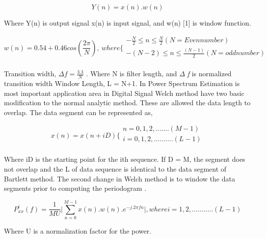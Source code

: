 \begin{enumerate}[label=\roman*]
\begin{equation}\tag{7.20}
Y ( n ) =x ( n ) .w ( n )
\end{equation}
\begin{justify}
Where Y(n) is output signal x(n) is input signal, and w(n) [1] is window function.
\end{justify}\par


\begin{equation}\tag{7.21}
w ( n ) =0.54+0.46cos ( \frac{2 \pi }{N} ) ,~ where \{ \begin{array}{ll}
	-\frac{N}{2} \leq n \leq \frac{N}{2}  ( N=Even number ) \\
	- ( N-2 )  \leq n \leq \frac{ ( N-1 ) }{2} ( N=odd number ) \\
	\end{array}
\end{equation}
\begin{justify}
Transition width,  \(  \Delta f=\frac{3.3}{N} \) . Where N is filter length, and $ \Delta $ \textit{f} is normalized transition width Window Length, L = N+1. In Power Spectrum Estimation is most important application area in Digital Signal Welch method have two basic modification to the normal analytic method. These are allowed the data length to overlap. The data segment can be represented as,
\end{justify}\par


\begin{equation}\tag{7.22}
x ( n ) =x ( n+iD )  \{ \begin{array}{ll}
	n=0,1,2, \ldots  \ldots . ( M-1 ) \\
	i=0,1,2, \ldots  \ldots  \ldots . ( L-1 ) \\
	\end{array}
\end{equation}
\begin{justify}
Where iD is the starting point for the ith sequence. If D = M, the segment does not overlap and the L of data sequence is identical to the data segment of Bartlett method. The second change in Welch method is to window the data segments prior to computing the periodogram \cite{liu2018survey}.
\end{justify}\par


\begin{equation}\tag{7.23}
P_{xx}^{i} ( f ) =\frac{1}{MU} \vert  \sum _{n=0}^{M-1}x ( n ) .w ( n ) .e^{-j.2 \pi fn} \vert , where i=1,2, \ldots  \ldots  \ldots .. ( L-1 )
\end{equation}
\begin{justify}
Where U is a normalization factor for the power.
\end{justify}\par



\end{enumerate}
